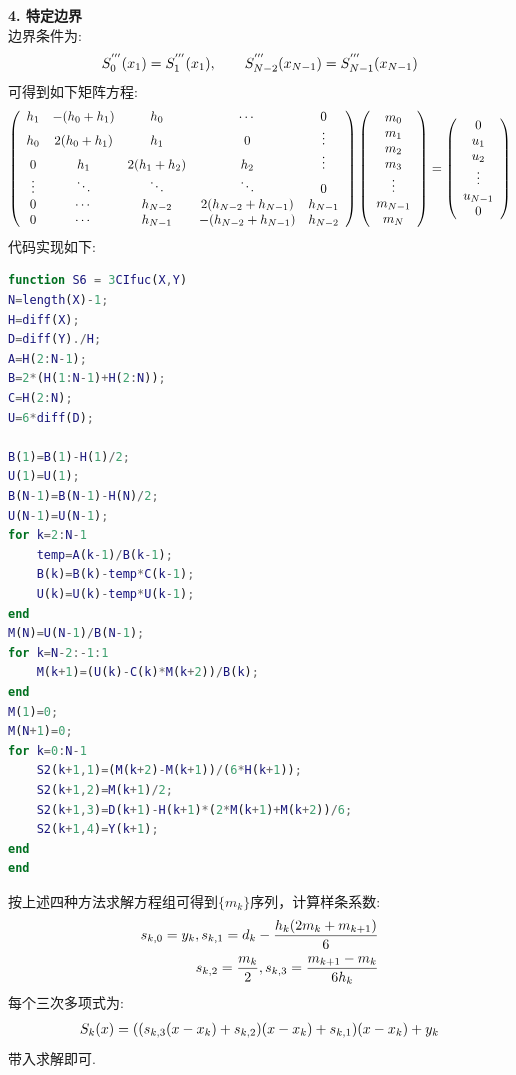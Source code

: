 \documentclass[UTF8]{ctexart}
\begin{document}
\textbf{4. 特定边界}\\
边界条件为:
\begin{align}
	S_0^{'''}(x_1)=S_1^{'''}(x_1),\qquad S_{N-2}^{'''}(x_{N-1})=S_{N-1}^{'''}(x_{N-1})\notag
\end{align}
可得到如下矩阵方程:\\
\begin{equation}
\left(
\begin{array}{ccccc}
h_1 & -(h_0+h_1) & h_0 & \cdots & 0 \\
h_0 & 2(h_0+h_1) & h_1 & 0 & \vdots\\
0 & h_1 & 2(h_1+h_2) & h_2 & \vdots\\
\vdots & \ddots & \ddots & \ddots & 0\\
0 & \cdots & h_{N-2} & 2(h_{N-2}+h_{N-1}) & h_{N-1}\\
0  & \cdots & h_{N-1} &-(h_{N-2}+h_{N-1}) & h_{N-2}
\end{array}
\right)
\left(
\begin{array}{c}
m_0\\
m_1\\
m_2\\
m_3\\
\vdots \\
m_{N-1}\\
m_{N}
\end{array}
\right)
=
\left(
\begin{array}{c}
0\\
u_1\\
u_2\\
\vdots \\
u_{N-1}\\
0
\end{array}
\right)\notag
\end{equation}
代码实现如下:
\begin{lstlisting}[language=matlab]
function S6 = 3CIfuc(X,Y)
N=length(X)-1;
H=diff(X);
D=diff(Y)./H;
A=H(2:N-1);
B=2*(H(1:N-1)+H(2:N));
C=H(2:N);
U=6*diff(D);

B(1)=B(1)-H(1)/2;
U(1)=U(1);
B(N-1)=B(N-1)-H(N)/2;
U(N-1)=U(N-1);
for k=2:N-1
	temp=A(k-1)/B(k-1);
	B(k)=B(k)-temp*C(k-1);
	U(k)=U(k)-temp*U(k-1);
end
M(N)=U(N-1)/B(N-1);
for k=N-2:-1:1
	M(k+1)=(U(k)-C(k)*M(k+2))/B(k);
end
M(1)=0;
M(N+1)=0;
for k=0:N-1
	S2(k+1,1)=(M(k+2)-M(k+1))/(6*H(k+1));
	S2(k+1,2)=M(k+1)/2;
	S2(k+1,3)=D(k+1)-H(k+1)*(2*M(k+1)+M(k+2))/6;
	S2(k+1,4)=Y(k+1);
end
end
\end{lstlisting}
按上述四种方法求解方程组可得到$\{m_k\}$序列，计算样条系数:
\begin{align}
	s_{k,0}=y_k, s_{k,1}=d_k-\frac{h_k(2m_k+m_{k+1})}{6}\notag \\
	s_{k,2}=\frac{m_k}{2}, s_{k,3}=\frac{m_{k+1}-m_k}{6h_k}\notag 
\end{align}
每个三次多项式为:
\begin{align}
	S_k(x)=((s_{k,3}(x-x_k)+s_{k,2})(x-x_k)+s_{k,1})(x-x_k)+y_k \notag
\end{align}
带入求解即可.
\end{document}
